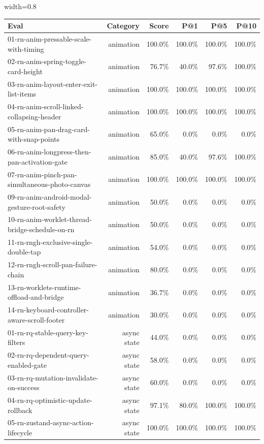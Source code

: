 \begin{table}[htbp]
\centering
\begin{adjustbox}{width=0.8\textwidth}
\begin{tabular}{lrrrrr}
\toprule
Eval & Category & Score & P@1 & P@5 & P@10 \\
\midrule
01-rn-anim-pressable-scale-with-timing & animation & 100.0\% & 100.0\% & 100.0\% & 100.0\% \\
02-rn-anim-spring-toggle-card-height & animation & 76.7\% & 40.0\% & 97.6\% & 100.0\% \\
03-rn-anim-layout-enter-exit-list-items & animation & 100.0\% & 100.0\% & 100.0\% & 100.0\% \\
04-rn-anim-scroll-linked-collapsing-header & animation & 100.0\% & 100.0\% & 100.0\% & 100.0\% \\
05-rn-anim-pan-drag-card-with-snap-points & animation & 65.0\% & 0.0\% & 0.0\% & 0.0\% \\
06-rn-anim-longpress-then-pan-activation-gate & animation & 85.0\% & 40.0\% & 97.6\% & 100.0\% \\
07-rn-anim-pinch-pan-simultaneous-photo-canvas & animation & 100.0\% & 100.0\% & 100.0\% & 100.0\% \\
09-rn-anim-android-modal-gesture-root-safety & animation & 50.0\% & 0.0\% & 0.0\% & 0.0\% \\
10-rn-anim-worklet-thread-bridge-schedule-on-rn & animation & 50.0\% & 0.0\% & 0.0\% & 0.0\% \\
11-rn-rngh-exclusive-single-double-tap & animation & 54.0\% & 0.0\% & 0.0\% & 0.0\% \\
12-rn-rngh-scroll-pan-failure-chain & animation & 80.0\% & 0.0\% & 0.0\% & 0.0\% \\
13-rn-worklets-runtime-offload-and-bridge & animation & 36.7\% & 0.0\% & 0.0\% & 0.0\% \\
14-rn-keyboard-controller-aware-scroll-footer & animation & 30.0\% & 0.0\% & 0.0\% & 0.0\% \\
01-rn-rq-stable-query-key-filters & async state & 44.0\% & 0.0\% & 0.0\% & 0.0\% \\
02-rn-rq-dependent-query-enabled-gate & async state & 58.0\% & 0.0\% & 0.0\% & 0.0\% \\
03-rn-rq-mutation-invalidate-on-success & async state & 60.0\% & 0.0\% & 0.0\% & 0.0\% \\
04-rn-rq-optimistic-update-rollback & async state & 97.1\% & 80.0\% & 100.0\% & 100.0\% \\
05-rn-zustand-async-action-lifecycle & async state & 100.0\% & 100.0\% & 100.0\% & 100.0\% \\

\end{tabular}
\end{adjustbox}
\end{table}
